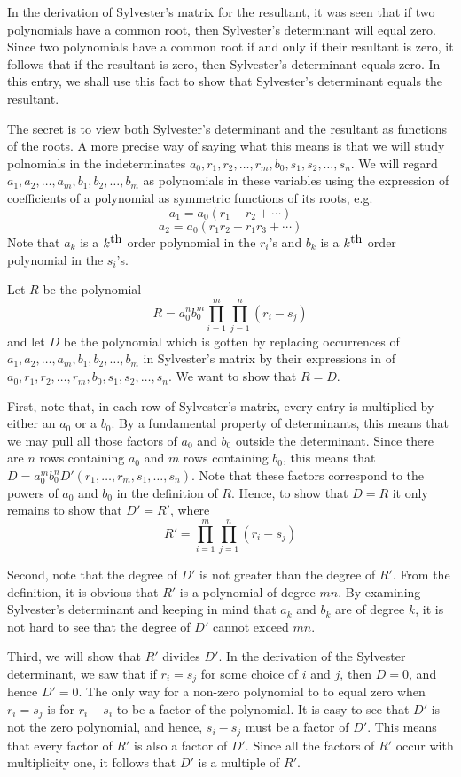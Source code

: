\documentclass[12pt]{article}
\begin{document}
In the derivation of Sylvester's matrix for the resultant, it was seen that if two polynomials have a common root, then Sylvester's determinant will equal zero.  Since two polynomials have a common root if and only if their resultant is zero, it follows that if the resultant is zero, then Sylvester's determinant equals zero.  In this entry, we shall use this fact to show that Sylvester's determinant equals the resultant.

The secret is to view both Sylvester's determinant and the resultant as functions of the roots.  A more precise way of saying what this means is that we will study polnomials in the indeterminates $a_0, r_1, r_2, \ldots, r_m, b_0, s_1, s_2, \ldots, s_n$.  We will regard $a_1, a_2, \ldots, a_m, b_1, b_2, \ldots, b_m$ as polynomials in these variables using the expression of coefficients of a polynomial as symmetric functions of its roots, e.g.
 $$a_1 = a_0 (r_1 + r_2 + \cdots)$$
 $$a_2 = a_0 (r_1 r_2 + r_1 r_3 + \cdots)$$
Note that $a_k$ is a $k^{\hbox{th}}$ order polynomial in the $r_i$'s and $b_k$ is a $k^{\hbox{th}}$ order polynomial in the $s_i$'s.

Let $R$ be the polynomial
 $$R = a_0^n b_0^m \prod_{i=1}^m \prod_{j=1}^n (r_i - s_j)$$
and let $D$ be the polynomial which is gotten by replacing occurrences of $a_1, a_2, \ldots, a_m, b_1, b_2, \ldots, b_m$ in Sylvester's matrix by their expressions in  of $a_0, r_1, r_2, \ldots, r_m, b_0, s_1, s_2, \ldots, s_n$.  We want to show that $R = D$.

First, note that, in each row of Sylvester's matrix, every entry is multiplied by either an $a_0$ or a $b_0$.  By a fundamental property of determinants, this means that we may pull all those factors of $a_0$ and $b_0$ outside the determinant.  Since there are $n$ rows containing $a_0$ and $m$ rows containing $b_0$, this means that $D = a_0^m b_0^n D'(r_1, \ldots, r_m, s_1, \ldots, s_n)$.  Note that these factors correspond to the powers of $a_0$ and $b_0$ in the definition of $R$.  Hence, to show that $D = R$ it only remains to show that $D' = R'$, where
 $$R' = \prod_{i=1}^m \prod_{j=1}^n (r_i - s_j)$$

Second, note that the degree of $D'$ is not greater than the degree of $R'$.  From the definition, it is obvious that $R'$ is a polynomial of degree $mn$.  By examining Sylvester's determinant and keeping in mind that $a_k$ and $b_k$ are of degree $k$, it is not hard to see that the degree of $D'$ cannot exceed $mn$.

Third, we will show that $R'$ divides $D'$.  In the derivation of the Sylvester determinant, we saw that if $r_i = s_j$ for some choice of $i$ and $j$, then $D=0$, and hence $D'=0$.  The only way for a non-zero polynomial to to equal zero when $r_i = s_j$ is for $r_i - s_i$ to be a factor of the polynomial.  It is easy to see that $D'$ is not the zero polynomial, and hence, $s_i - s_j$ must be a factor of $D'$.  This means that every factor of $R'$ is also a factor of $D'$.  Since all the factors of $R'$ occur with multiplicity one, it follows that $D'$ is a multiple of $R'$.
\end{document}

